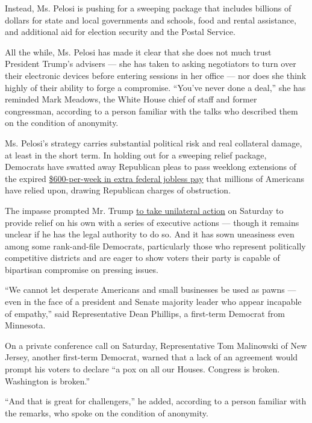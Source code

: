 Instead, Ms. Pelosi is pushing for a sweeping package that includes
billions of dollars for state and local governments and schools, food
and rental assistance, and additional aid for election security and the
Postal Service.

All the while, Ms. Pelosi has made it clear that she does not much trust
President Trump's advisers --- she has taken to asking negotiators to
turn over their electronic devices before entering sessions in her
office --- nor does she think highly of their ability to forge a
compromise. ``You've never done a deal,'' she has reminded Mark Meadows,
the White House chief of staff and former congressman, according to a
person familiar with the talks who described them on the condition of
anonymity.

Ms. Pelosi's strategy carries substantial political risk and real
collateral damage, at least in the short term. In holding out for a
sweeping relief package, Democrats have swatted away Republican pleas to
pass weeklong extensions of the expired
\href{https://www.nytimes.com/2020/08/08/business/economy/lost-unemployment-benefits.html}{\$600-per-week
in extra federal jobless pay} that millions of Americans have relied
upon, drawing Republican charges of obstruction.

The impasse prompted Mr. Trump
\href{https://www.nytimes.com/2020/08/07/us/politics/trump-congress-stimulus.html}{to
take unilateral action} on Saturday to provide relief on his own with a
series of executive actions --- though it remains unclear if he has the
legal authority to do so. And it has sown uneasiness even among some
rank-and-file Democrats, particularly those who represent politically
competitive districts and are eager to show voters their party is
capable of bipartisan compromise on pressing issues.

``We cannot let desperate Americans and small businesses be used as
pawns --- even in the face of a president and Senate majority leader who
appear incapable of empathy,'' said Representative Dean Phillips, a
first-term Democrat from Minnesota.

On a private conference call on Saturday, Representative Tom Malinowski
of New Jersey, another first-term Democrat, warned that a lack of an
agreement would prompt his voters to declare ``a pox on all our Houses.
Congress is broken. Washington is broken.''

``And that is great for challengers,'' he added, according to a person
familiar with the remarks, who spoke on the condition of anonymity.

